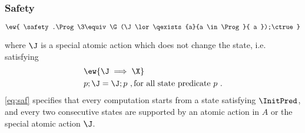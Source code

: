 \subsubsection{Safety}

\[ \ew{ \safety.\Prog  \3\equiv  \G (\J \lor \qexists{a}{a \in \Prog}{ a });\ctrue } \]

where $\J$ is a special atomic action which does not change the state,
i.e. satisfying
\begin{align}
  & \ew{\J \implies \X} \notag \\
  & p;\J = \J;p~, \textrm{for all state predicate $p$}~.  \label{eq:skip}
\end{align}
\eqref{eq:saf} specifies that every computation starts from a
state satisfying $\InitPred$, and every two consecutive states are
supported by an atomic action in $A$ or the special atomic
action $\J$.

